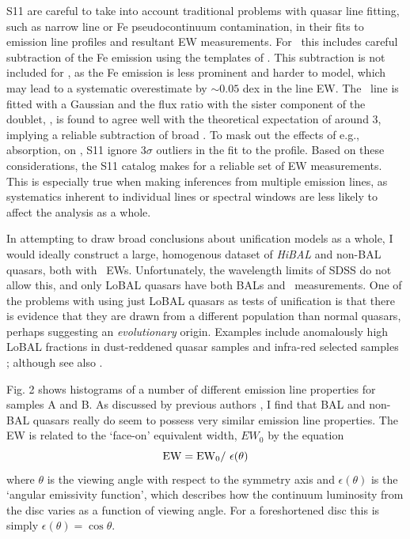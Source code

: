 S11 are careful to take into account traditional problems with quasar line fitting,
such as narrow line or Fe pseudocontinuum contamination, in their fits to 
emission line profiles and resultant EW measurements. For \mgline\
this includes careful subtraction of the Fe emission using the templates
of \citep{vestergaard2001}. This subtraction is not included for \civfull,
as the Fe emission is less prominent and harder to model, which may lead to
a systematic overestimate by $\sim0.05$ dex in the line EW. 
The \oiiifull\ line is fitted
with a Gaussian and the flux ratio with the sister component 
of the doublet, \oiiidoublet, is found to agree well with the theoretical
expectation of around 3, implying a reliable subtraction of broad \hb.
To mask out the effects of e.g., absorption, on \civ, S11 ignore 
$3\sigma$ outliers in the fit to the profile. Based on these
considerations, the S11 catalog makes for a reliable set of EW 
measurements. This is especially true when making inferences from 
multiple emission lines, as systematics inherent to individual lines 
or spectral windows are less likely to affect the analysis as a whole.

In attempting to draw broad conclusions about unification models as a whole,
I would ideally construct a large, homogenous dataset of 
{\em HiBAL} and non-BAL quasars, both with \oiiifull\ EWs. Unfortunately,
the wavelength limits of SDSS do not allow this, and only LoBAL quasars have 
both BALs and \ewo\ measurements. One of the problems with
using just LoBAL quasars as tests of unification is that there is evidence 
that they are drawn from a different population than normal quasars, perhaps
suggesting an {\em evolutionary} origin. Examples include anomalously 
high LoBAL fractions in dust-reddened quasar samples \citep{urrutia2009} 
and infra-red selected samples \citep{dai2012}; 
although see also \cite{lazarova2012}.


Fig. 2 shows histograms of a number of different 
emission line properties for samples A and B. 
As discussed by previous authors \cite[e.g.][]{weymann1991}, I find that BAL
and non-BAL quasars really do seem to possess very similar emission line 
properties. The EW is related to the `face-on' equivalent width,
$EW_0$ by the equation
\begin{equation}
{\rm EW} = {\rm EW}_0 /~\epsilon(\theta)
\end{equation}
where $\theta$ is the viewing angle with respect to the symmetry axis 
and $\epsilon(\theta)$ is the `angular emissivity function', which describes 
how the continuum luminosity from the disc varies as a function of viewing angle.
For a foreshortened disc this is simply $\epsilon(\theta) = \cos \theta$.

